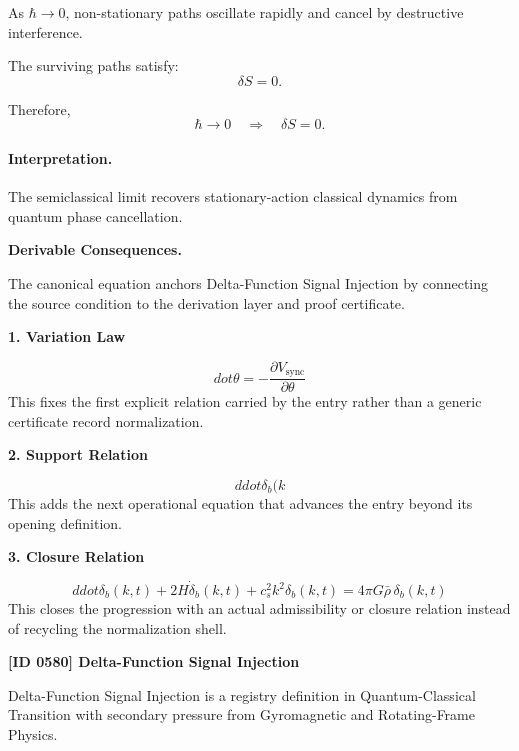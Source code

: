 As $\hbar\to 0$, non-stationary paths oscillate rapidly and cancel by destructive interference.

The surviving paths satisfy:
\begin{equation}
\delta S=0 .
\end{equation}

Therefore,
\begin{equation}
\boxed{
\hbar\rightarrow 0
\quad\Longrightarrow\quad
\delta S=0 .
}
\end{equation}

\paragraph{Interpretation.}
The semiclassical limit recovers stationary-action classical dynamics from quantum phase cancellation.

\par\vspace{0.35em}
\noindent\textbf{Derivable Consequences.}\quad
\begingroup
\footnotesize
\raggedright
The canonical equation anchors Delta-Function Signal Injection by connecting the source condition to the derivation layer and proof certificate.
\par\endgroup

\noindent\textbf{1. Variation Law}\par
\[
dot\theta = -\frac{\partial V_{\text{sync}}}{\partial \theta}
\]
\noindent This fixes the first explicit relation carried by the entry rather than a generic certificate record normalization.\par
\noindent\textbf{2. Support Relation}\par
\[
ddot{\delta}_b(k
\]
\noindent This adds the next operational equation that advances the entry beyond its opening definition.\par
\noindent\textbf{3. Closure Relation}\par
\[
ddot{\delta}_b(k,t) + 2 H \dot{\delta}_b(k,t) + c_s^2 k^2 \delta_b(k,t) = 4\pi G \bar\rho\,\delta_b(k,t)
\]
\noindent This closes the progression with an actual admissibility or closure relation instead of recycling the normalization shell.\par

\clearpage
\noindent\textbf{[ID 0580] Delta-Function Signal Injection}\par
\vspace{0.35em}
\begingroup\small
{}
Delta-Function Signal Injection is a registry definition in Quantum-Classical Transition with secondary pressure from Gyromagnetic and Rotating-Frame Physics.


